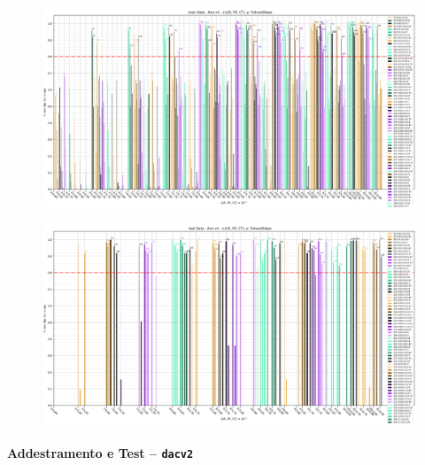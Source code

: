 \newpage
\thispagestyle{empty}

\begin{figure}[H]
    \centering
    \includegraphics[scale=0.55,rotate=-90]{figures/train_annv4_2d.png}
    \caption{}
    \label{fig:TrainV4}
\end{figure}

\newpage
\thispagestyle{empty}

\begin{figure}[H]
    \centering
    \includegraphics[scale=0.55,rotate=-90]{figures/test_annv4_2d.png}
    \caption{}
    \label{fig:TestV4}
\end{figure}

\newpage
\restoregeometry


\paragraph{Addestramento e Test -- \texttt{dacv2}}\label{par:dacv2}\hfill

